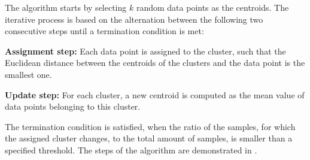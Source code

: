 The algorithm starts by selecting $k$ random data points as the centroids. The iterative process is based on the alternation between the following two consecutive steps until a termination condition is met:
\begin{description}
    \item{\textbf{Assignment step:}} Each data point is assigned to the cluster, such that the Euclidean distance between the centroids of the clusters and the data point is the smallest one.
    \item{\textbf{Update step:}} For each cluster, a new centroid is computed as the mean value of data points belonging to this cluster.
\end{description}

The termination condition is satisfied, when the ratio of the samples, for which the assigned cluster changes, to the total amount of samples, is smaller than a specified threshold. The steps of the algorithm are demonstrated in .
